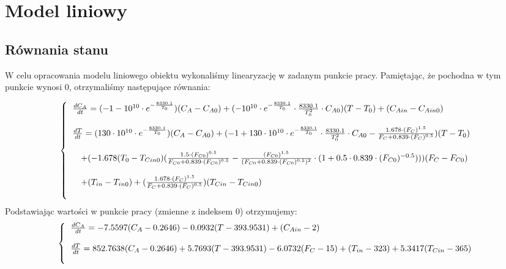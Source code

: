 \chapter{Model liniowy}
\section{Równania stanu}
W celu opracowania modelu liniowego obiektu wykonaliśmy linearyzację w zadanym punkcie pracy. Pamiętając, że pochodna w tym punkcie wynosi 0, otrzymaliśmy następujące równania:

\begin{equation}
\left\{
\begin{tabular}{l}
$\frac{dC_A}{dt} = (-1-10^{10}\cdot e^{-\frac{8330.1}{T_0}})(C_A-C_{A0})+(-10^{10}\cdot e^{-\frac{8330.1}{T_0}}\cdot \frac{8330.1}{T_0^2}\cdot C_{A0})(T-T_0)+(C_{Ain}-C_{Ain0})$\\\\
$\frac{dT}{dt} = (130\cdot 10^{10}\cdot e^{-\frac{8330.1}{T_0}})(C_A-C_{A0}) + (-1+130\cdot 10^{10}\cdot e^{-\frac{8330.1}{T_0}}\cdot \frac{8330.1}{T_0^2}\cdot C_{A0}-\frac{1.678\cdot (F_C)^{1.5}}{F_C+0.839\cdot (F_C)^{0.5}})(T-T_0)$\\\\
$\quad + (-1.678(T_0-T_{Cin0})(\frac{1.5\cdot (F_{C0})^{0.5}}{F_{C0}+0.839\cdot (F_{C0})^{0.5}}-\frac{ (F_{C0})^{1.5}}{(F_{C0}+0.839\cdot (F_{C0})^{0.5})^2}\cdot (1+0.5\cdot 0.839 \cdot (F_{C0})^{-0.5})))(F_C-F_{C0})$\\\\
$\quad + (T_{in} - T_{in0}) + (\frac{1.678\cdot (F_C)^{1.5}}{F_C+0.839\cdot (F_C)^{0.5}})(T_{Cin} - T_{Cin0})$\\\\
\end{tabular}
\right.
\end{equation}
Podstawiając wartości w punkcie pracy (zmienne z indeksem 0) otrzymujemy:
\begin{equation}
\left\{
\begin{tabular}{l}
$\frac{dC_A}{dt} = -7.5597(C_A-0.2646)-0.0932(T-393.9531)+(C_{Ain}-2)$\\\\
$\frac{dT}{dt} = 852.7638(C_A-0.2646) + 5.7693(T-393.9531) -6.0732(F_C-15) + (T_{in} - 323) + 5.3417(T_{Cin} - 365)$\\\\
\end{tabular}
\right.
\end{equation}

